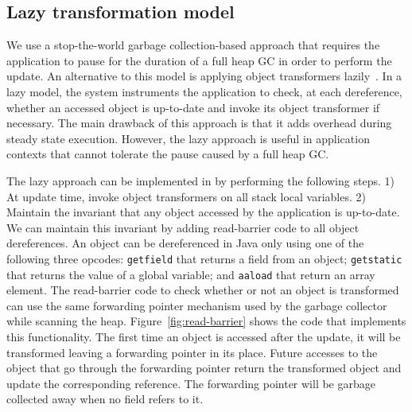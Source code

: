 
\subsection{Lazy transformation model}
We use a stop-the-world garbage collection-based approach that requires the
application to pause for the duration of a full heap GC in order to perform
the update. An alternative to this model is applying object transformers
lazily~\cite{ritzau00dynamic,Mala00a,boyapati03lazy,neamtiu06dsu,chen:icse07}.
In a lazy model, the system instruments the application to check, at each
dereference, whether an accessed object is up-to-date and invoke its object
transformer if necessary. The main drawback of this approach is that it
adds overhead during steady state execution. However, the lazy approach is
useful in application contexts that cannot tolerate the pause caused by a
full heap GC.



The lazy approach can be implemented in \JV by performing the following
steps. 1) At update time, invoke object transformers on all stack local
variables. 2) Maintain the invariant that any object accessed by the
application is up-to-date. We can maintain this invariant by adding
read-barrier code to all object dereferences. An object can be dereferenced
in Java only using one of the following three opcodes: {\tt getfield} that
returns a field from an object; {\tt getstatic} that returns the value of a
global variable; and {\tt aaload} that return an array element. The
read-barrier code to check whether or not an object is transformed can use
the same forwarding pointer mechanism used by the garbage collector while
scanning the heap.  Figure~\ref{fig:read-barrier} shows the code that
implements this functionality.  The first time an object is accessed after
the update, it will be transformed leaving a forwarding pointer in its
place. Future accesses to the object that go through the forwarding pointer
return the transformed object and update the corresponding reference. The
forwarding pointer will be garbage collected away when no field refers to
it.

